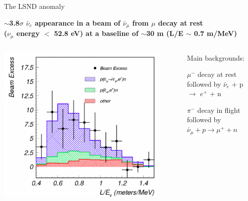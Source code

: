 \begin{frame}[t]{The LSND anomaly}

\begin{center}
{\bf $\sim$3.8$\sigma$ $\bar{\nu}_{e}$ appearance in a beam of $\bar{\nu}_{\mu}$ from $\mu$ decay at rest\\
($\nu_{\mu}$ energy $<$ 52.8 eV) at a baseline of $\sim$30 m (L/E $\sim$ 0.7 m/MeV)}\\
\end{center}
\begin{columns}
  \begin{column}{0.50\textwidth}
    \includegraphics[width=0.90\textwidth]{./images/beyond3nu/accelerator/lsnd_excess.png}\\
  \end{column}
  \begin{column}{0.50\textwidth}
  {\small
    Main backgrounds:\\
    \begin{itemize}
    {\small
     \item ${\mu}^{-}$ decay at rest\\
           followed by $\bar{\nu}_{e}$ + p $\rightarrow$ $e^{+}$ + n
     \item ${\pi}^{-}$ decay in flight\\
           followed by $\bar{\nu}_{\mu}+p \rightarrow \mu^{+}+n$\\
}
\end{itemize}}
\end{column}
\end{columns}
\end{frame}
